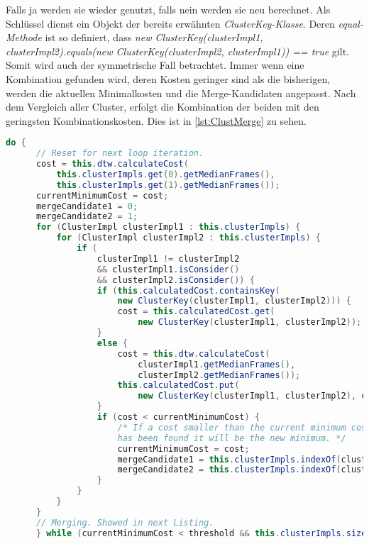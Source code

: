 Falls ja werden sie wieder genutzt, falls nein werden sie neu berechnet.
Als Schlüssel dienst ein Objekt der bereits erwähnten \emph{ClusterKey-Klasse}.
Deren \emph{equal-Methode} ist so definiert,
dass \emph{new ClusterKey(clusterImpl1, clusterImpl2).equals(new ClusterKey(clusterImpl2, clusterImpl1)) == true} gilt.
Somit wird auch der symmetrische Fall betrachtet.
Immer wenn eine Kombination gefunden wird, deren Kosten geringer sind als die bisherigen,
werden die aktuellen Minimalkosten und die Merge-Kandidaten angepasst.
Nach dem Vergleich aller Cluster, erfolgt die Kombination der beiden mit den geringsten Kombinationskosten.
Dies ist in \autoref{lst:ClustMerge} zu sehen.
\begin{lstfloat}
\begin{lstlisting}[language=Java, label={lst:ClustCalc}, caption=Cluster-Methode: Berechnungsvorgang.]
  do {
      // Reset for next loop iteration.
      cost = this.dtw.calculateCost(    
          this.clusterImpls.get(0).getMedianFrames(),
          this.clusterImpls.get(1).getMedianFrames());
      currentMinimumCost = cost;
      mergeCandidate1 = 0;
      mergeCandidate2 = 1;
      for (ClusterImpl clusterImpl1 : this.clusterImpls) {
          for (ClusterImpl clusterImpl2 : this.clusterImpls) {
              if (
                  clusterImpl1 != clusterImpl2
                  && clusterImpl1.isConsider()
                  && clusterImpl2.isConsider()) {
                  if (this.calculatedCost.containsKey(
                      new ClusterKey(clusterImpl1, clusterImpl2))) {
                      cost = this.calculatedCost.get(
                          new ClusterKey(clusterImpl1, clusterImpl2));
                  }
                  else {
                      cost = this.dtw.calculateCost(
                          clusterImpl1.getMedianFrames(),
                          clusterImpl2.getMedianFrames());
                      this.calculatedCost.put(
                          new ClusterKey(clusterImpl1, clusterImpl2), cost);
                  }
                  if (cost < currentMinimumCost) {
                      /* If a cost smaller than the current minimum cost
                      has been found it will be the new minimum. */
                      currentMinimumCost = cost;
                      mergeCandidate1 = this.clusterImpls.indexOf(clusterImpl1);
                      mergeCandidate2 = this.clusterImpls.indexOf(clusterImpl2);
                  }
              }
          }
      }
      // Merging. Showed in next Listing.
      } while (currentMinimumCost < threshold && this.clusterImpls.size() > 1);
\end{lstlisting}
\end{lstfloat}
